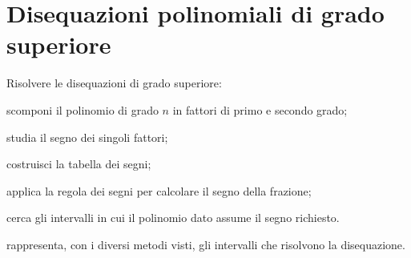 %  
%
%

\section{Disequazioni polinomiali di grado superiore}
\label{sec:diseq_grado_superiore}

\begin{procedura}
Risolvere le disequazioni di grado superiore:
\begin{enumeratea}
\item scomponi il polinomio di grado \(n\) in fattori di primo e secondo
grado;
\item studia il segno dei singoli fattori;
\item costruisci la tabella dei segni;
\item applica la regola dei segni per calcolare il segno della frazione;
\item cerca gli intervalli in cui il polinomio dato assume il segno richiesto.
\item rappresenta, con i diversi metodi visti, gli intervalli che
 risolvono la disequazione.
\end{enumeratea}
\end{procedura}

